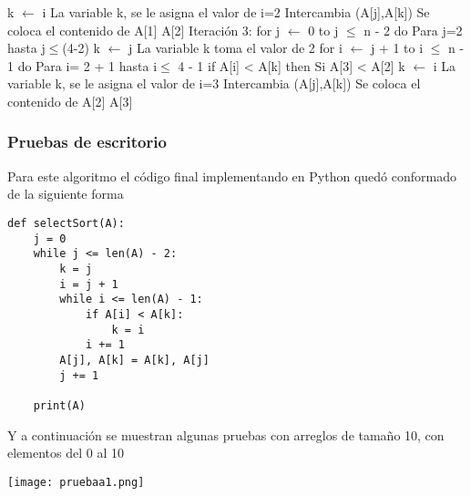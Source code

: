 \documentclass[12pt,twoside]{article}
\begin{document}
\hspace*{2cm}k $\longleftarrow$ i \hspace*{1cm}La variable k, se le
asigna el valor de i=2 \newline
\hspace*{1.5cm}Intercambia (A[j],A[k]) \hspace*{1cm}Se coloca el
contenido de A[1] A[2]\newline \newline
Iteración 3:\newline
for j $\longleftarrow$ 0 to j $\leq$ n - 2 do \hspace*{1cm}Para j=2
hasta j$\leq$(4-2) \newline
\hspace*{1cm}k $\longleftarrow$ j \hspace*{1cm}La variable k toma el
valor de 2 \newline
\hspace*{1cm}for i $\longleftarrow$ j + 1 to i $\leq$ n - 1 do
\hspace*{1cm}Para i= 2 + 1 hasta i$\leq$ 4 - 1 \newline
\hspace*{1.5cm}if A[i] < A[k] then \hspace*{1cm}Si A[3] < A[2]
\newline
\hspace*{2cm}k $\longleftarrow$ i \hspace*{1cm}La variable k, se le
asigna el valor de i=3 \newline
\hspace*{1.5cm}Intercambia (A[j],A[k]) \hspace*{1cm}Se coloca el
contenido de A[2] A[3]
\subsubsection{Pruebas de escritorio}
Para este algoritmo el código final implementando en Python quedó conformado de la siguiente forma
\begin{lstlisting}
def selectSort(A):
    j = 0
    while j <= len(A) - 2:
        k = j
        i = j + 1
        while i <= len(A) - 1:
            if A[i] < A[k]:
                k = i
            i += 1
        A[j], A[k] = A[k], A[j]
        j += 1

    print(A)
\end{lstlisting}
Y a continuación se muestran algunas pruebas con arreglos de tamaño 10, con elementos del 0 al 10
\begin{center}
    \texttt{[image: pruebaa1.png]}
\end{center}
\end{document}
